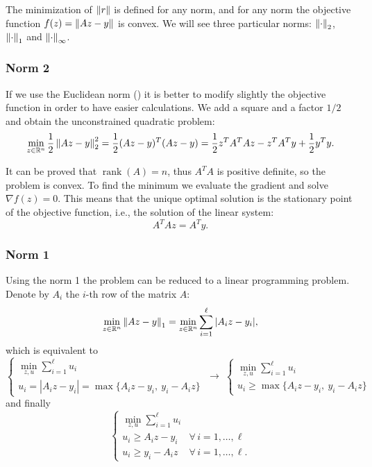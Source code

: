 The minimization of $\left\lVert r \right\rVert$ is defined for any norm, and for any norm the objective function $f(z) = \left\lVert Az-y \right\rVert$ is convex. We will see three particular norms: $\left\lVert \cdot \right\rVert_2$, $\left\lVert \cdot \right\rVert_1$ and $\left\lVert \cdot \right\rVert_\infty$.

\subsubsection{Norm 2}

If we use the Euclidean norm () it is better to modify slightly the objective function in order to have easier calculations. We add a square and a factor $1/2$ and obtain the unconstrained quadratic problem:
\[
\min_{z \in \mathbb{R}^n} \frac{1}{2}\left\lVert Az-y \right\rVert_2^2
= \frac{1}{2}(Az-y)^T(Az-y)
= \frac{1}{2} z^T A^T A z - z^T A^T y + \frac{1}{2} y^T y.
\]

It can be proved that $\operatorname{rank}(A) = n$, thus $A^TA$ is positive definite, so the problem is convex. To find the minimum we evaluate the gradient and solve $\nabla f(z) = 0$. This means that the unique optimal solution is the stationary point of the objective function, i.e., the solution of the linear system:
\[
A^TAz=A^Ty.
\]

\subsubsection{Norm 1}

Using the norm 1 the problem can be reduced to a linear programming problem. Denote by $A_i$ the $i$-th row of the matrix $A$:
\[
\min_{z \in \mathbb{R}^n} \left\lVert Az-y \right\rVert_1 = \min_{z \in \mathbb{R}^n} \sum_{i=1}^{\ell} |A_i z - y_i|,
\]
which is equivalent to
\[
\begin{cases}
\displaystyle \min_{z,u} \sum_{i=1}^{\ell} u_i\\[1ex]
u_i = |A_i z - y_i| = \max\{A_i z - y_i,\ y_i - A_i z\}
\end{cases}
\;\to\;
\begin{cases}
\displaystyle \min_{z,u} \sum_{i=1}^{\ell} u_i\\[1ex]
u_i \ge \max\{A_i z - y_i,\ y_i - A_i z\}
\end{cases}
\]
and finally
\[
\begin{cases}
\displaystyle \min_{z,u} \sum_{i=1}^{\ell} u_i\\[1ex]
u_i \ge A_i z - y_i & \forall\, i=1,\dots,\ell\\
u_i \ge y_i - A_i z & \forall\, i=1,\dots,\ell.
\end{cases}
\]

